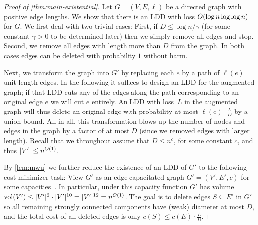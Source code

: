 \documentclass[letterpaper,11pt]{article}
\begin{document}
\begin{proof}[Proof of \cref{thm:main-existential}]
Let $G = (V, E, \ell)$ be a directed graph with positive edge lengths. We show that there is an LDD with loss $O(\log n \log\log n)$ for $G$. We first deal with two trivial cases: First, if $D \leq \log n / \gamma$ (for some constant $\gamma > 0$ to be determined later) then we simply remove all edges and stop. Second, we remove all edges with length more than $D$ from the graph. In both cases edges can be deleted with probability $1$ without harm.

Next, we transform the graph into $G'$ by replacing each $e$ by a path of $\ell(e)$ unit-length edges. In the following it suffices to design an LDD for the augmented graph; if that LDD cuts any of the edges along the path corresponding to an original edge $e$ we will cut $e$ entirely. An LDD with loss~$L$ in the augmented graph will thus delete an original edge with probability at most $\ell(e) \cdot \frac{L}{D}$ by a union bound. All in all, this transformation blows up the number of nodes and edges in the graph by a factor of at most $D$ (since we removed edges with larger length). Recall that we throughout assume that $D \leq n^c$, for some constant $c$, and thus $|V'| \leq n^{O(1)}$.

By \cref{lem:mwu} we further reduce the existence of an LDD of $G'$ to the following cost-minimizer task: View $G'$ as an edge-capacitated graph $G' = (V', E', c)$ for some capacities~. In particular, under this capacity function $G'$ has volume $\operatorname{vol}(V') \leq |V'|^2 \cdot |V'|^{10} = |V'|^{12} = n^{O(1)}$. The goal is to delete edges $S \subseteq E'$ in $G'$ so all remaining strongly connected components have (weak) diameter at most $D$, and the total cost of all deleted edges is only $c(S) \leq c(E) \cdot \frac{L}{D}$.


\end{proof}
\end{document}
